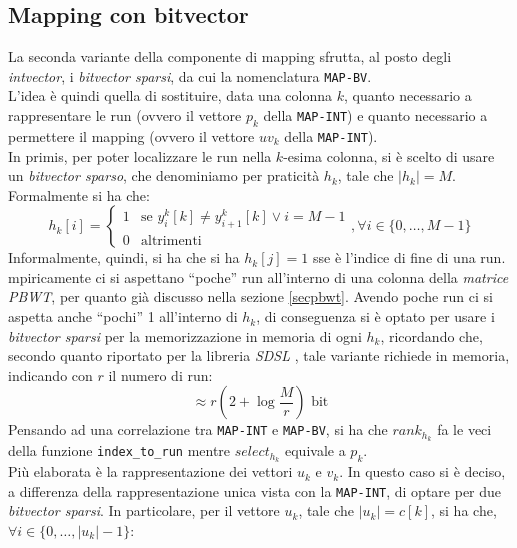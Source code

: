 \subsection{Mapping con bitvector}
La seconda variante della componente di mapping sfrutta, al posto degli
\textit{intvector}, i \textit{bitvector sparsi}, da cui la nomenclatura
\texttt{MAP-BV}.\\
L'idea è quindi quella di sostituire, data una colonna $k$, quanto necessario a
rappresentare le run (ovvero il vettore $p_k$ della \texttt{MAP-INT}) e quanto
necessario a permettere il mapping (ovvero il vettore $uv_k$ della
\texttt{MAP-INT}).\\ 
In primis, per poter localizzare le run nella $k$-esima colonna, si è scelto di
usare un \textit{bitvector sparso}, che denominiamo per praticità $h_k$, tale
che $|h_k|=M$. Formalmente si ha che:
\begin{equation}
  \label{eq:bv1}
  h_k[i]=
  \begin{cases}
    1&\mbox{se } y^k_{i}[k]\neq y^k_{i+1}[k]\lor i=M-1\\
    0&\mbox{altrimenti}
  \end{cases},\forall i\in \{0,\ldots,M-1\}
\end{equation}
Informalmente, quindi, si ha che si ha $h_k[j]=1$ sse è l'indice di fine di una
run.\\
mpiricamente ci si aspettano ``poche'' run all'interno di una colonna della
\textit{matrice PBWT}, per quanto già discusso nella sezione
\ref{secpbwt}. Avendo poche run ci si aspetta anche ``pochi'' 1 all'interno di
$h_k$, di conseguenza si è optato per usare i \textit{bitvector sparsi} per la
memorizzazione in memoria di ogni $h_k$, ricordando che, secondo quanto
riportato per la libreria \textit{SDSL} \cite{sdsl}, tale variante richiede in
memoria, indicando con $r$ il numero di run:
\begin{equation}
  \label{eq:bv2}
  \approx r\left(2+\log\frac{M}{r}\right)\mbox{ bit}
\end{equation}
Pensando ad una correlazione tra \texttt{MAP-INT} e \texttt{MAP-BV}, si ha che
$rank_{h_k}$ fa le veci della funzione \texttt{index\_to\_run} mentre
$select_{h_k}$ equivale a $p_k$.\\
Più elaborata è la rappresentazione dei vettori $u_k$ e $v_k$. In questo caso si
è deciso, a differenza della rappresentazione unica vista con la
\texttt{MAP-INT}, di optare per due \textit{bitvector sparsi}. In particolare,
per il vettore $u_k$, tale che $|u_k|=c[k]$, si ha che, $\forall
i\in\{0,\ldots,|u_k|-1\}$: 
